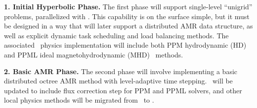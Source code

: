 \documentclass[10pt,twocolumn]{article}
\begin{document}
   

\textbf{1. Initial Hyperbolic Phase.} The first phase will support
single-level ``unigrid'' problems, parallelized with \charm.  This
capability is on the surface simple, but it must be designed in a way
that will later support a distributed AMR data structure, as well as
explicit dynamic task scheduling and load balancing methods.  The
associated \enzoii\ physics implementation will include both PPM
hydrodynamic (HD) and PPML ideal magnetohydrodynamic
(MHD)~\cite{UsPo09} methods.

\textbf{2. Basic AMR Phase.}  The second phase will involve implementing a
basic distributed octree AMR method with level-adaptive time stepping.
\enzoii\ will be updated to include flux correction step for PPM and
PPML solvers, and other local physics methods will be migrated from
\enzo\ to \enzoii.
\end{document}
